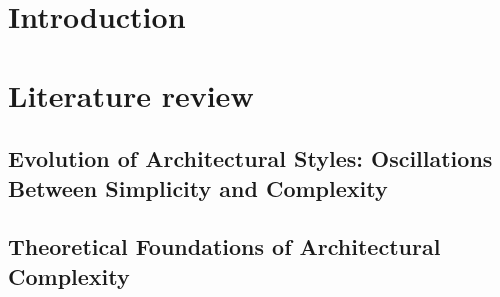 \begin{linenumbers}
\section{Introduction}
\label{sec:1Introduction}




\section{Literature review}
\label{sec:LiteratureReview}


\subsection{Evolution of Architectural Styles: Oscillations Between Simplicity and Complexity}
\label{subsec:TimelineArchitectureStyles}




\subsection{Theoretical Foundations of Architectural Complexity}
\label{subsec:ComplexityStudies}



\end{linenumbers}
